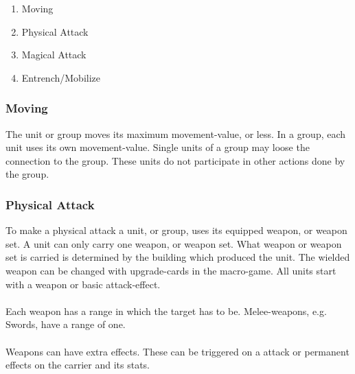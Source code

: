 \documentclass[a5paper,pagesize,10pt,bibtotoc,pointlessnumbers,
normalheadings,DIV=9,twoside=false]{scrbook}
\begin{document}
\begin{enumerate}
\item Moving
\item Physical Attack
\item Magical Attack
\item Entrench/Mobilize
\end{enumerate}

\subsubsection{Moving}
The unit or group moves its maximum movement-value, or less.
In a group, each unit uses its own movement-value. Single units of a group may loose the connection to the group. These units do not participate in other actions done by the group.

\subsubsection{Physical Attack}
To make a physical attack a unit, or group, uses its equipped weapon, or weapon set. 
A unit can only carry one weapon, or weapon set.
What weapon or weapon set is carried is determined by the building which produced the unit. The wielded weapon can be changed with upgrade-cards in the macro-game.
All units start with a weapon or basic attack-effect.\\
\\
Each weapon has a range in which the target has to be. Melee-weapons, e.g. Swords, have a range of one.\\
\\
Weapons can have extra effects. These can be triggered on a attack or permanent effects on the carrier and its stats.\\
\end{document}
